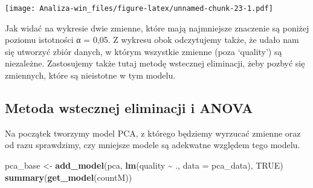 \documentclass[
]{article}
\newenvironment{Shaded}{\begin{snugshade}}{\end{snugshade}}
\newcommand{\AttributeTok}[1]{\textcolor[rgb]{0.13,0.29,0.53}{#1}}
\newcommand{\ConstantTok}[1]{\textcolor[rgb]{0.56,0.35,0.01}{#1}}
\newcommand{\DecValTok}[1]{\textcolor[rgb]{0.00,0.00,0.81}{#1}}
\newcommand{\FunctionTok}[1]{\textcolor[rgb]{0.13,0.29,0.53}{\textbf{#1}}}
\newcommand{\NormalTok}[1]{#1}
\newcommand{\OtherTok}[1]{\textcolor[rgb]{0.56,0.35,0.01}{#1}}
\newcommand{\SpecialCharTok}[1]{\textcolor[rgb]{0.81,0.36,0.00}{\textbf{#1}}}
\newcommand{\StringTok}[1]{\textcolor[rgb]{0.31,0.60,0.02}{#1}}
\begin{document}
\begin{Shaded}
\end{Shaded}

\texttt{[image: Analiza-win\_files/figure-latex/unnamed-chunk-23-1.pdf]}

Jak widać na wykresie dwie zmienne, które mają najmniejsze znaczenie są
poniżej poziomu istotności α = 0,05. Z wykresu obok odczytujemy także,
że udało nam się utworzyć zbiór danych, w którym wszystkie zmienne (poza
`quality') są niezależne. Zastosujemy także tutaj metodę wstecznej
eliminacji, żeby pozbyć się zmiennych, które są nieistotne w tym modelu.

\subsection{Metoda wstecznej eliminacji i
ANOVA}\label{metoda-wstecznej-eliminacji-i-anova-1}

Na początek tworzymy model PCA, z którego będziemy wyrzucać zmienne oraz
od razu sprawdzimy, czy mniejsze modele są adekwatne względem tego
modelu.

\begin{Shaded}
\begin{Highlighting}[]
\NormalTok{pca\_base }\OtherTok{\textless{}{-}} \FunctionTok{add\_model}\NormalTok{(}\StringTok{\textquotesingle{}pca\textquotesingle{}}\NormalTok{, }\FunctionTok{lm}\NormalTok{(quality }\SpecialCharTok{\textasciitilde{}}\NormalTok{ ., }\AttributeTok{data =}\NormalTok{ pca\_data), }\ConstantTok{TRUE}\NormalTok{)}
\FunctionTok{summary}\NormalTok{(}\FunctionTok{get\_model}\NormalTok{(countM))}
\end{Highlighting}
\end{Shaded}
\end{document}
